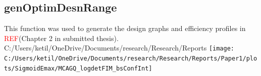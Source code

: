 \documentclass{article}
\newcommand*{\REF}{\textcolor{red}{REF}}
\theoremstyle{example}
\begin{document}
    \subsection{genOptimDesnRange}
    
    

    This function was used to generate the design graphs and efficiency profiles in \REF (Chapter 2 in submitted thesis).
    C:/Users/ketil/OneDrive/Documents/research/Research/Reports
\texttt{[image: C:/Users/ketil/OneDrive/Documents/research/Research/Reports/Paper1/plots/SigmoidEmax/MCAGQ\_logdetFIM\_bsConfInt]}    

	
\end{document}
